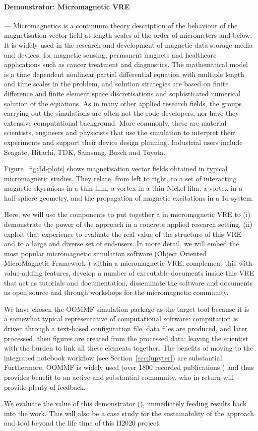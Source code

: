 \paragraph{Demonstrator: Micromagnetic VRE}
\label{sec:introduction-micromagnetic-vre-demonstrator}
--- Micromagnetics is a continuum theory description of the behaviour of
the magnetisation vector field at length scales of the order of
micrometers and below. It is widely used in the research and
development of magnetic data storage media and devices, for magnetic
sensing, permanent magnets and healthcare applications such as cancer
treatment and diagnostics. The mathematical model is a time dependent
nonlinear partial differential equation with multiple length and time
scales in the problem, and solution strategies are based on finite
difference and finite element space discretisations and sophisticated
numerical solution of the equations. As in many other applied research fields,
the groups carrying out the simulations are often not the code
developers, nor have they extensive computational background. More
commonly, these are material scientists, engineers and physicists that
use the simulation to interpret their experiments and support their
device design planning. Industrial users include Seagate, Hitachi,
TDK, Samsung, Bosch and Toyota.

Figure~\ref{fig:3d-plots} shows magnetisation vector fields obtained
in typical micromagnetic studies. They relate, from left to
right, to a set of interacting magnetic skyrmions in a thin flim, a
vortex in a thin Nickel film, a vortex in a half-sphere geometry, and
the propagation of magnetic excitations in a 1d-system.

Here, we will use the \TheProject components to put
together a in micromagnetic VRE to (i) demonstrate the power of the
approach in a concrete applied research setting, (ii) exploit that
experience to evaluate the real value of the structure of this VRE and
\TheProject to a large and diverse set of end-users. In more detail, we will embed the most popular micromagnetic
simulation software (Object Oriented MicroMagnetic Framework
\cite{OOMMF-url}) within a micromagnetic VRE, complement this with
value-adding features, develop a number of executable
documents inside this VRE that act as tutorials and documentation,
disseminate the software and documents as open source and through
workshops for the micromagnetic community.  

We have chosen the OOMMF simulation package as the target tool because
it is a somewhat typical representative of computational software:
computation is driven through a text-based configuration file, data
files are produced, and later processed, then figures are created from
the processed data; leaving the scientist with the burden to link all
these elements together. The benefits of moving to the integrated
notebook workflow (see Section~\ref{sec:jupyter}) are
substantial. Furthermore, OOMMF is widely used (over 1800 recorded
publications \cite{OOMMF-citations-url}) and thus provides benefit to
an active and substantial community, who in return will provide plenty
of feedback.

We evaluate the value of this demonstrator
(), immediately feeding
results back into the \TheProject work. This will also
be a case study for the sustainability of the approach and tool beyond
the life time of this H2020 project.

